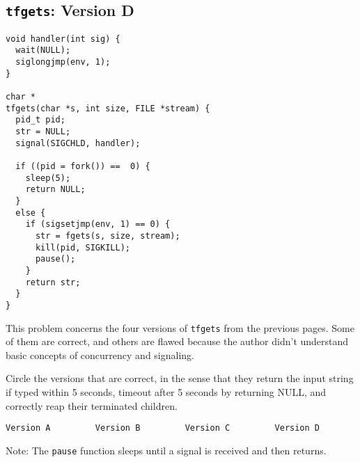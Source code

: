 \newpage
\subsection*{{\tt tfgets}: Version D}

{\small
\begin{verbatim}
void handler(int sig) {
  wait(NULL);
  siglongjmp(env, 1);
}

char *
tfgets(char *s, int size, FILE *stream) {
  pid_t pid;
  str = NULL;
  signal(SIGCHLD, handler);

  if ((pid = fork()) ==  0) {
    sleep(5);
    return NULL;
  }
  else {
    if (sigsetjmp(env, 1) == 0) {
      str = fgets(s, size, stream);
      kill(pid, SIGKILL);
      pause();
    }
    return str;
  }
}
\end{verbatim}}

\newpage
\begin{problem}{8}
This problem concerns the four versions of {\tt tfgets} from the
previous pages. Some of them are correct,  and others are 
flawed because the author didn't understand basic concepts of
concurrency and signaling. 

Circle the versions that are correct, in the sense that they return
the input string if typed within 5 seconds, timeout after 5
seconds by returning NULL, and correctly reap their terminated
children.
\end{problem}

\begin{verbatim}
Version A         Version B         Version C         Version D         
\end{verbatim}

Note: The {\tt pause} function sleeps until a signal is
received and then returns.

